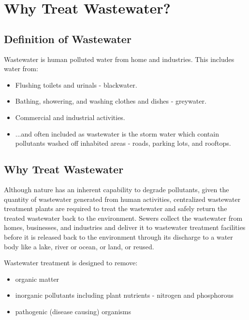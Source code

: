 
\chapter{Why Treat Wastewater?}

\section{Definition of Wastewater}


Wastewater is human polluted water from home and industries. This includes water from:
\begin{itemize}
\item Flushing toilets and urinals  - blackwater.
\item Bathing, showering, and washing clothes and dishes  - greywater.
\item Commercial and industrial activities.
\item ...and often included as wastewater is the storm water which contain pollutants washed off inhabited areas - roads, parking lots, and rooftops.
\end{itemize}

\section{Why Treat Wastewater}
Although nature has an inherent capability to degrade pollutants, given the quantity of wastewater generated from human activities, centralized wastewater treatment plants are required to treat the wastewater and safely return the treated wastewater back to the environment.  Sewers collect the wastewater from homes, businesses, and industries and deliver it to wastewater treatment facilities before it is released back to the environment through its discharge to a water body like a lake, river or ocean, or land, or reused. 

Wastewater treatment is designed to remove:
\begin{itemize}
\item organic matter
\item inorganic  pollutants including plant nutrients - nitrogen and phosphorous\\
\item pathogenic (disease causing) organisms\\
\end{itemize}

